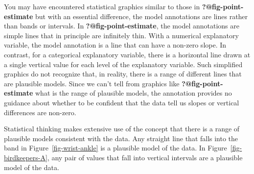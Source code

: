 \documentclass[
  letterpaper,
  DIV=11,
  numbers=noendperiod,
  oneside]{scrartcl}
\begin{document}
You may have encountered statistical graphics similar to those in
\textbf{?@fig-point-estimate} but with an essential difference, the
model annotations are lines rather than bands or intervals. In
\textbf{?@fig-point-estimate}, the model annotations are simple lines
that in principle are infinitely thin. With a numerical explanatory
variable, the model annotation is a line that can have a non-zero slope.
In contrast, for a categorical explanatory variable, there is a
horizontal line drawn at a single vertical value for each level of the
explanatory variable. Such simplified graphics do not recognize that, in
reality, there is a range of different lines that are plausible models.
Since we can't tell from graphics like \textbf{?@fig-point-estimate}
what is the range of plausible models, the annotation provides no
guidance about whether to be confident that the data tell us slopes or
vertical differences are non-zero.

Statistical thinking makes extensive use of the concept that there is a
range of plausible models consistent with the data. Any straight line
that falls into the band in Figure~\ref{fig-wrist-ankle} is a plausible
model of the data. In Figure~\ref{fig-birdkeepers-A}, any pair of values
that fall into vertical intervals are a plausible model of the data.
\end{document}
